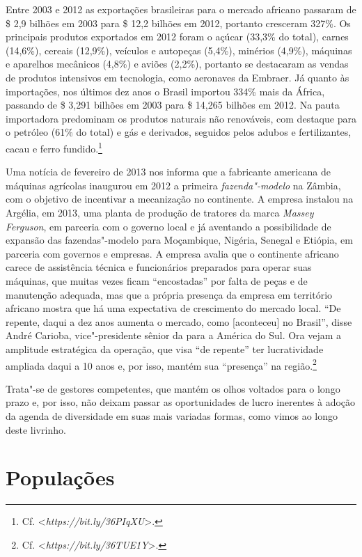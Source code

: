 Entre 2003 e 2012 as exportações brasileiras para o mercado africano
passaram de \$ 2,9 bilhões em 2003 para \$ 12,2 bilhões em 2012,
portanto cresceram 327\%. Os principais produtos exportados em 2012
foram o açúcar (33,3\% do total), carnes (14,6\%), cereais (12,9\%),
veículos e autopeças (5,4\%), minérios (4,9\%), máquinas e aparelhos
mecânicos (4,8\%) e aviões (2,2\%), portanto se destacaram as vendas de
produtos intensivos em tecnologia, como aeronaves da Embraer. Já quanto
às importações, nos últimos dez anos o Brasil importou 334\% mais da
África, passando de \$ 3,291 bilhões em 2003 para \$ 14,265 bilhões
em 2012. Na pauta importadora predominam os produtos naturais não
renováveis, com destaque para o petróleo (61\% do total) e gás e
derivados, seguidos pelos adubos e fertilizantes, cacau e ferro
fundido.\footnote{Cf. \textless{}\emph{https://bit.ly/36PIqXU}\textgreater{}.}

Uma notícia de fevereiro de 2013 nos informa que a fabricante americana
de máquinas agrícolas  inaugurou em 2012 a primeira
\emph{fazenda"-modelo} na Zâmbia, com o objetivo de incentivar a
mecanização no continente. A empresa instalou na Argélia, em 2013, uma
planta de produção de tratores da marca \emph{Massey Ferguson}, em
parceria com o governo local e já aventando a possibilidade de expansão
das fazendas"-modelo para Moçambique, Nigéria, Senegal e Etiópia, em
parceria com governos e empresas. A empresa avalia que o continente
africano carece de assistência técnica e funcionários preparados para
operar suas máquinas, que muitas vezes ficam ``encostadas'' por falta de
peças e de manutenção adequada, mas que a própria presença da empresa em
território africano mostra que há uma expectativa de crescimento do
mercado local. ``De repente, daqui a dez anos aumenta o mercado, como
{[}aconteceu{]} no Brasil'', disse André Carioba, vice"-presidente sênior
da  para a América do Sul. Ora vejam a amplitude estratégica da
operação, que visa ``de repente'' ter lucratividade ampliada daqui a 10
anos e, por isso, mantém sua ``presença'' na região.\footnote{Cf.
  \textless{}\emph{https://bit.ly/36TUE1Y}\textgreater{}.}

Trata"-se de gestores competentes, que mantém os olhos voltados para o
longo prazo e, por isso, não deixam passar as oportunidades de lucro
inerentes à adoção da agenda de diversidade em suas mais variadas
formas, como vimos ao longo deste livrinho.

\section{Populações}

